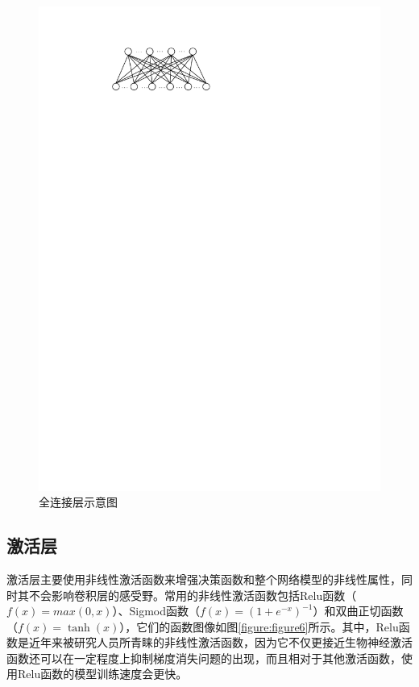 \begin{figure}[htbp]
    \begin{center}
    \includegraphics{figures/fc.pdf}
    \end{center}
    \caption{全连接层示意图}\label{figure:figure5}
\end{figure}

\subsection{激活层}
\label{chapter:chapter2-1-4}
激活层主要使用非线性激活函数来增强决策函数和整个网络模型的非线性属性，同时其不会影响卷积层的感受野。常用的非线性激活函数包括Relu函数（$f(x)=max(0,x)$）、Sigmod函数（$f(x)=(1+e^{-x})^{-1}$）和双曲正切函数（$f(x)=\tanh(x)$），它们的函数图像如图\ref{figure:figure6}所示。其中，Relu函数是近年来被研究人员所青睐的非线性激活函数，因为它不仅更接近生物神经激活函数还可以在一定程度上抑制梯度消失问题的出现，而且相对于其他激活函数，使用Relu函数的模型训练速度会更快。

